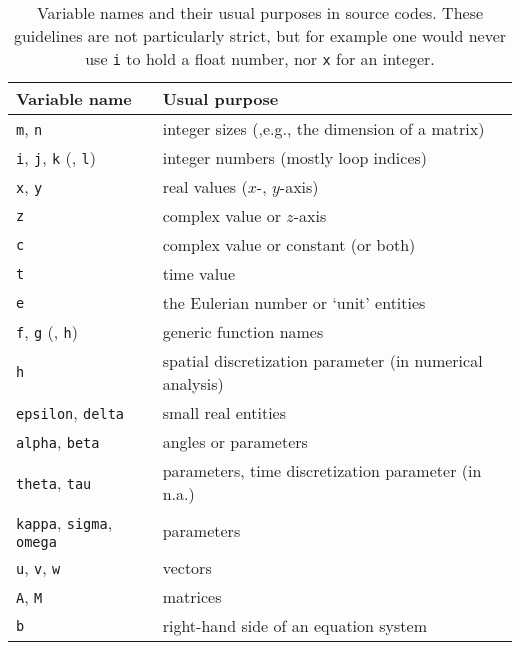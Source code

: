 \begin{itemize}
\begin{table}
\centering
\begin{tabular}{ll}
\toprule
Variable name                                                 & Usual purpose\\\midrule
\lstinline!m!, \lstinline!n!                                  & integer sizes (,e.g., the dimension of a matrix)\\
\lstinline!i!, \lstinline!j!, \lstinline!k! (, \lstinline!l!) & integer numbers (mostly loop indices)\\
\lstinline!x!, \lstinline!y!                                  & real values ($x$-, $y$-axis)\\
\lstinline!z!                                                 & complex value or $z$-axis\\
\lstinline!c!                                                 & complex value or constant (or both)\\
\lstinline!t!                                                 & time value\\
\lstinline!e!                                                 & the Eulerian number or `unit' entities\\
\lstinline!f!, \lstinline!g! (, \lstinline!h!)                & generic function names\\
\lstinline!h!                                                 & spatial discretization parameter (in numerical analysis)\\
\lstinline!epsilon!, \lstinline!delta!                        & small real entities\\
\lstinline!alpha!, \lstinline!beta!                           & angles or parameters\\
\lstinline!theta!, \lstinline!tau!                            & parameters, time discretization parameter (in n.a.)\\
\lstinline!kappa!, \lstinline!sigma!, \lstinline!omega!       & parameters\\
\lstinline!u!, \lstinline!v!, \lstinline!w!                   & vectors\\
\lstinline!A!, \lstinline!M!                                  & matrices\\
\lstinline!b!                                                 & right-hand side of an equation system\\\bottomrule
\end{tabular}
\caption{Variable names and their usual purposes in source codes. These guidelines are not particularly strict, but for example one would never use \lstinline!i! to hold a float number, nor \lstinline!x! for an integer.}
\label{table:typical-variable-usage}
\end{table}
\end{itemize}

